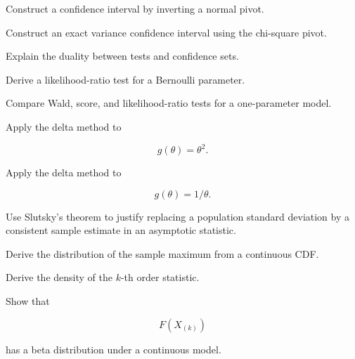 \begin{exercise}[3]
Construct a confidence interval by inverting a normal pivot.
\end{exercise}

\begin{exercise}[3]
Construct an exact variance confidence interval using the chi-square
pivot.
\end{exercise}

\begin{exercise}[3]
Explain the duality between tests and confidence sets.
\end{exercise}

\begin{exercise}[3]
Derive a likelihood-ratio test for a Bernoulli parameter.
\end{exercise}

\begin{exercise}[3]
Compare Wald, score, and likelihood-ratio tests for a one-parameter
model.
\end{exercise}

\begin{exercise}[3]
Apply the delta method to

\[
g(\theta)=\theta^2.
\]
\end{exercise}

\begin{exercise}[3]
Apply the delta method to

\[
g(\theta)=1/\theta.
\]
\end{exercise}

\begin{exercise}[3]
Use Slutsky's theorem to justify replacing a population standard
deviation by a consistent sample estimate in an asymptotic statistic.
\end{exercise}

\begin{exercise}[3]
Derive the distribution of the sample maximum from a continuous CDF.
\end{exercise}

\begin{exercise}[3]
Derive the density of the \(k\)-th order statistic.
\end{exercise}

\begin{exercise}[3]
Show that

\[
F(X_{(k)})
\]

has a beta distribution under a continuous model.
\end{exercise}

